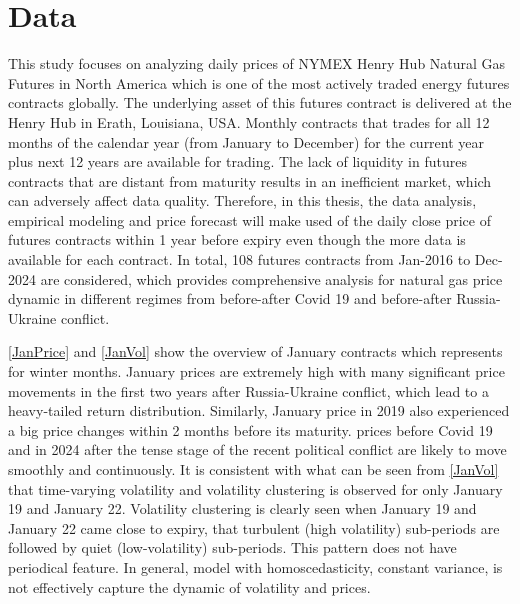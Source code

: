 \documentclass[12pt,a4paper]{article}
\newcommand\colorAutoref[1]{{\hypersetup{linkcolor=black}\autoref{#1}}}
\numberwithin{equation}{section}
\begin{document}
\section{Data}

This study focuses on analyzing daily prices of NYMEX Henry Hub Natural Gas Futures in North America which is one of the most actively traded energy futures contracts globally. The underlying asset of this futures contract is delivered at the Henry Hub in Erath, Louisiana, USA. Monthly contracts that trades for all 12 months of the calendar year (from January to December) for the current year plus next 12 years are available for trading. The lack of liquidity in futures contracts that are distant from maturity results in an inefficient market, which can adversely affect data quality. Therefore, in this thesis, the data analysis, empirical modeling and price forecast will make used of the daily close price of futures contracts within 1 year before expiry even though the more data is available for each contract. In total, 108 futures contracts from Jan-2016 to Dec-2024 are considered, which provides comprehensive analysis for natural gas price dynamic in different regimes from before-after Covid 19 and before-after Russia-Ukraine conflict. 

\colorAutoref{JanPrice} and \colorAutoref{JanVol} show the overview of January contracts which represents for winter months. January prices are extremely high with many significant price movements in the first two years after Russia-Ukraine conflict, which lead to a heavy-tailed return distribution. Similarly, January price in 2019 also experienced a big price changes within 2 months before its maturity. prices before Covid 19 and in 2024 after the tense stage of the recent political conflict are likely to move smoothly and continuously. It is consistent with what can be seen from \colorAutoref{JanVol} that time-varying volatility and volatility clustering is observed for only January 19 and January 22. Volatility clustering is clearly seen when January 19 and January 22 came close to expiry, that turbulent (high volatility) sub-periods are followed by quiet (low-volatility) sub-periods. This pattern does not have periodical feature. In general, model with homoscedasticity, constant variance, is not effectively capture the dynamic of volatility and prices.
\end{document}

